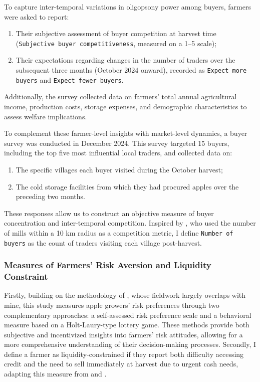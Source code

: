 \documentclass[12pt]{article}
\begin{document}
To capture inter-temporal variations in oligopsony power among buyers, farmers were asked to report:
\begin{enumerate}
    \item Their subjective assessment of buyer competition at harvest time (\texttt{Subjective buyer competitiveness}, measured on a 1–5 scale);
    \item Their expectations regarding changes in the number of traders over the subsequent three months (October 2024 onward), recorded as \texttt{Expect more buyers} and \texttt{Expect fewer buyers}.
\end{enumerate}

Additionally, the survey collected data on farmers' total annual agricultural income, production costs, storage expenses, and demographic characteristics to assess welfare implications.

To complement these farmer-level insights with market-level dynamics, a buyer survey was conducted in December 2024. This survey targeted 15 buyers, including the top five most influential local traders, and collected data on:
\begin{enumerate}
    \item The specific villages each buyer visited during the October harvest;
    \item The cold storage facilities from which they had procured apples over the preceding two months.
\end{enumerate}
These responses allow us to construct an objective measure of buyer concentration and inter-temporal competition. Inspired by \cite{macchiavello2021competition}, who used the number of mills within a 10 km radius as a competition metric, I define \texttt{Number of buyers} as the count of traders visiting each village post-harvest.


\subsubsection{Measures of Farmers' Risk Aversion and Liquidity Constraint}

Firstly, building on the methodology of \cite{jin2024losses}, whose fieldwork largely overlaps with mine, this study measures apple growers' risk preferences through two complementary approaches: a self-assessed risk preference scale and a behavioral measure based on a Holt-Laury-type lottery game. These methods provide both subjective and incentivized insights into farmers' risk attitudes, allowing for a more comprehensive understanding of their decision-making processes. Secondly, I define a farmer as liquidity-constrained if they report both difficulty accessing credit and the need to sell immediately at harvest due to urgent cash needs, adapting this measure from \cite{albuquerque2024market} and \cite{stephens2011incomplete}.
\end{document}
